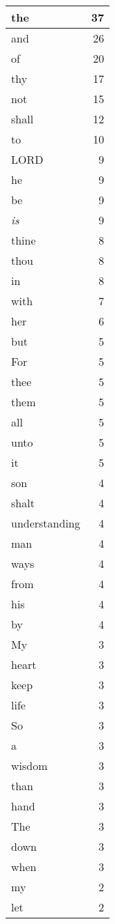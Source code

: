 \begin{center}
\begin{longtable}{l|r}
the & 37\\ \hline 
and & 26\\ \hline 
of & 20\\ \hline 
thy & 17\\ \hline 
not & 15\\ \hline 
shall & 12\\ \hline 
to & 10\\ \hline 
LORD & 9\\ \hline 
he & 9\\ \hline 
be & 9\\ \hline 
\emph{is} & 9\\ \hline 
thine & 8\\ \hline 
thou & 8\\ \hline 
in & 8\\ \hline 
with & 7\\ \hline 
her & 6\\ \hline 
but & 5\\ \hline 
For & 5\\ \hline 
thee & 5\\ \hline 
them & 5\\ \hline 
all & 5\\ \hline 
unto & 5\\ \hline 
it & 5\\ \hline 
son & 4\\ \hline 
shalt & 4\\ \hline 
understanding & 4\\ \hline 
man & 4\\ \hline 
ways & 4\\ \hline 
from & 4\\ \hline 
his & 4\\ \hline 
by & 4\\ \hline 
My & 3\\ \hline 
heart & 3\\ \hline 
keep & 3\\ \hline 
life & 3\\ \hline 
So & 3\\ \hline 
a & 3\\ \hline 
wisdom & 3\\ \hline 
than & 3\\ \hline 
hand & 3\\ \hline 
The & 3\\ \hline 
down & 3\\ \hline 
when & 3\\ \hline 
my & 2\\ \hline 
let & 2\\ \hline 

\end{longtable}
\end{center}
